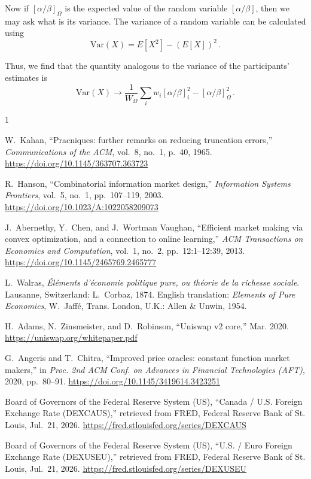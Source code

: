 \documentclass[letterpaper]{article}
\newcommand{\priceAB}{\left[\alpha / \beta\right]}
\begin{document}
Now if $\priceAB_\Omega$ is the expected value of the random variable $\priceAB$, then we may ask what is its variance. The variance of a random variable can be calculated using
\begin{equation*}
    \mathrm{Var}(X) = E[X^2] - (E[X])^2 \, .
\end{equation*}

Thus, we find that the quantity analogous to the variance of the participants' estimates is
\begin{equation*}
    \mathrm{Var}(X) \rightarrow \frac{1}{W_\Omega} \sum_i w_i \priceAB_i^2 - \priceAB_\Omega^2  \, .
\end{equation*}

\begin{thebibliography}{1}

W.~Kahan, ``Pracniques: further remarks on reducing truncation errors,'' \emph{Communications of the ACM}, vol.~8, no.~1, p.~40, 1965. \url{https://doi.org/10.1145/363707.363723}

R.~Hanson, ``Combinatorial information market design,'' \emph{Information Systems Frontiers}, vol.~5, no.~1, pp.~107--119, 2003. \url{https://doi.org/10.1023/A:1022058209073}

J.~Abernethy, Y.~Chen, and J.~Wortman Vaughan, ``Efficient market making via convex optimization, and a connection to online learning,'' \emph{ACM Transactions on Economics and Computation}, vol.~1, no.~2, pp.~12:1--12:39, 2013. \url{https://doi.org/10.1145/2465769.2465777}

L.~Walras, \emph{Éléments d'économie politique pure, ou théorie de la richesse sociale}. Lausanne, Switzerland: L.~Corbaz, 1874. English translation: \emph{Elements of Pure Economics}, W.~Jaffé, Trans. London, U.K.: Allen \& Unwin, 1954.

H.~Adams, N.~Zinsmeister, and D.~Robinson, ``Uniswap v2 core,'' Mar. 2020. \url{https://uniswap.org/whitepaper.pdf}

G.~Angeris and T.~Chitra, ``Improved price oracles: constant function market makers,'' in \emph{Proc. 2nd ACM Conf. on Advances in Financial Technologies (AFT)}, 2020, pp.~80--91. \url{https://doi.org/10.1145/3419614.3423251}

Board of Governors of the Federal Reserve System (US), ``Canada / U.S. Foreign Exchange Rate (DEXCAUS),'' retrieved from FRED, Federal Reserve Bank of St. Louis, Jul.~21, 2026. \url{https://fred.stlouisfed.org/series/DEXCAUS}

Board of Governors of the Federal Reserve System (US), ``U.S. / Euro Foreign Exchange Rate (DEXUSEU),'' retrieved from FRED, Federal Reserve Bank of St. Louis, Jul.~21, 2026. \url{https://fred.stlouisfed.org/series/DEXUSEU}

\end{thebibliography}
\end{document}
